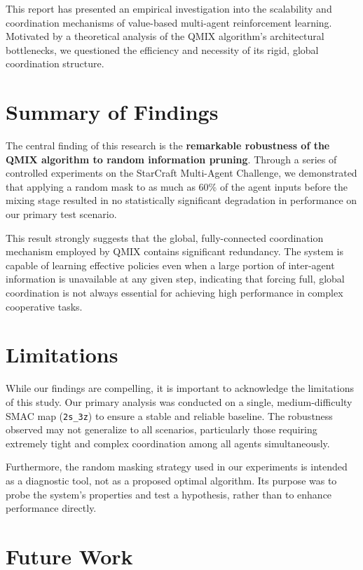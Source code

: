 \documentclass[../Main.tex]{subfiles}
\begin{document}
This report has presented an empirical investigation into the scalability and coordination mechanisms of value-based multi-agent reinforcement learning. Motivated by a theoretical analysis of the QMIX algorithm's architectural bottlenecks, we questioned the efficiency and necessity of its rigid, global coordination structure.

\section{Summary of Findings}

The central finding of this research is the \textbf{remarkable robustness of the QMIX algorithm to random information pruning}. Through a series of controlled experiments on the StarCraft Multi-Agent Challenge, we demonstrated that applying a random mask to as much as 60\% of the agent inputs before the mixing stage resulted in no statistically significant degradation in performance on our primary test scenario.

This result strongly suggests that the global, fully-connected coordination mechanism employed by QMIX contains significant redundancy. The system is capable of learning effective policies even when a large portion of inter-agent information is unavailable at any given step, indicating that forcing full, global coordination is not always essential for achieving high performance in complex cooperative tasks.

\section{Limitations}

While our findings are compelling, it is important to acknowledge the limitations of this study. Our primary analysis was conducted on a single, medium-difficulty SMAC map (\texttt{2s\_3z}) to ensure a stable and reliable baseline. The robustness observed may not generalize to all scenarios, particularly those requiring extremely tight and complex coordination among all agents simultaneously.

Furthermore, the random masking strategy used in our experiments is intended as a diagnostic tool, not as a proposed optimal algorithm. Its purpose was to probe the system's properties and test a hypothesis, rather than to enhance performance directly.

\section{Future Work}
\end{document}
